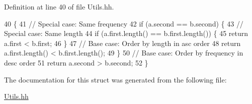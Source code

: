 Definition at line 40 of file Utils.\+hh.


\begin{DoxyCode}
40                                                                                  \{
41             \textcolor{comment}{// Special case: Same frequency}
42             \textcolor{keywordflow}{if} (a.second == b.second) \{
43                 \textcolor{comment}{// Special case: Same length}
44                 \textcolor{keywordflow}{if} (a.first.length() == b.first.length()) \{
45                     \textcolor{keywordflow}{return} a.first < b.first;
46                 \}
47                 \textcolor{comment}{// Base case: Order by length in asc order}
48                 \textcolor{keywordflow}{return} a.first.length() < b.first.length();
49             \}
50             \textcolor{comment}{// Base case: Order by frequency in desc order}
51             \textcolor{keywordflow}{return} a.second > b.second;
52         \}
\end{DoxyCode}


The documentation for this struct was generated from the following file\+:\begin{DoxyCompactItemize}
\item 
\hyperlink{_utils_8hh}{Utils.\+hh}\end{DoxyCompactItemize}
